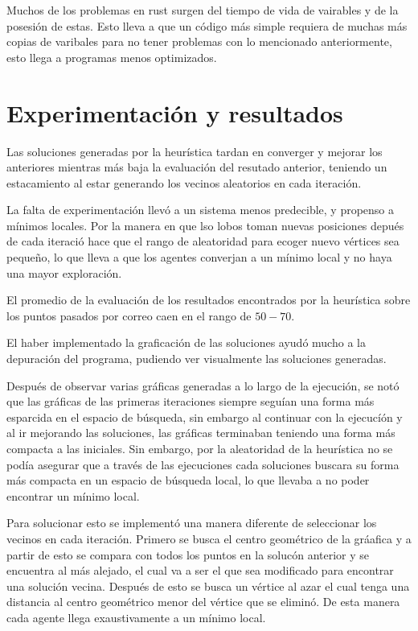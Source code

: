 \documentclass[a4paper]{report}
\begin{document}
Muchos de los problemas en rust surgen del tiempo de vida de vairables y de la posesi\'on de estas. Esto lleva a que un c\'odigo m\'as simple requiera de muchas m\'as copias de varibales para no tener
problemas con lo mencionado anteriormente, esto llega a programas menos optimizados. ~\cite{rust}
\section*{Experimentaci\'on y resultados}

Las soluciones generadas por la heur\'istica tardan en converger y mejorar los anteriores mientras
m\'as baja la evaluaci\'on del resutado anterior, teniendo un estacamiento al estar generando los
vecinos aleatorios en cada iteraci\'on.



La falta de experimentaci\'on llev\'o a un sistema menos predecible, y propenso a m\'inimos locales.
Por la manera en que lso lobos toman nuevas posiciones depu\'es de cada iteraci\'o hace que el rango de aleatoridad para ecoger nuevo v\'ertices sea pequeño, lo que lleva a que los agentes converjan a
un m\'inimo local y no haya una mayor exploraci\'on.

El promedio de la evaluaci\'on de los resultados encontrados por la heur\'istica sobre los puntos pasados por correo caen en el rango de $50 - 70$. 

El haber implementado la graficaci\'on de las soluciones ayud\'o mucho a la depuraci\'on del programa, pudiendo ver visualmente las soluciones generadas. 

 Despu\'es de observar varias gr\'aficas generadas a lo largo de la ejecuci\'on, se not\'o que las gr\'aficas de las primeras iteraciones siempre segu\'ian una forma m\'as esparcida
en el espacio de b\'usqueda, sin embargo al continuar con la ejecuc\'i\'on y al ir mejorando las
soluciones, las gr\'aficas terminaban teniendo una forma m\'as compacta a las iniciales. Sin embargo, por la
aleatoridad de la heur\'istica no se pod\'ia asegurar que a trav\'es de las ejecuciones cada soluciones buscara su forma m\'as compacta en un espacio de b\'usqueda local, lo que llevaba a no poder encontrar un m\'inimo
local.


Para solucionar esto se implement\'o una manera diferente de seleccionar los vecinos en cada iteraci\'on. Primero se busca el centro geom\'etrico de la gr\'aafica y a partir de esto se compara con
todos los puntos en la soluc\'on anterior y se encuentra al m\'as alejado, el cual va a ser el que
sea modificado para encontrar una soluci\'on vecina. Despu\'es de esto se busca un v\'ertice al azar
el cual tenga una distancia al centro geom\'etrico menor del v\'ertice que se elimin\'o. De esta
manera cada agente llega exaustivamente a un m\'inimo local.
\end{document}
